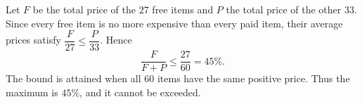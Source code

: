 Let $F$ be the total price of the $27$ free items and $P$ the total price of the other $33$. Since every free item is no more expensive than every paid item, their average prices satisfy $\dfrac{F}{27}\le \dfrac{P}{33}$. Hence
\[
\dfrac{F}{F+P}\le\dfrac{27}{60}=45\%.
\]
The bound is attained when all $60$ items have the same positive price. Thus the maximum is $\boxed{45\%}$, and it cannot be exceeded.
